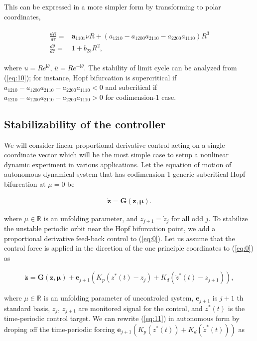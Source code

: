 \documentclass[openacc]{rsproca_new}%
\def\real{\mathbb{R}}
\def\vec#1{\ensuremath{\mathbf{#1}}}
\newcommand{\Eref}[1]{(\ref{#1})}
\begin{document}
\noindent This can be expressed in a more simpler form by transforming to polar coordinates,

\begin{align}\label{eq:10}
\begin{split}
\frac{dR}{d\tau}=&\vec{a}_{1101}\nu R+(a_{1210}-a_{1200}a_{2110}-a_{2200}a_{1110})R^3\\
\frac{d\theta}{d\tau}=&1+b_{23}R^2,
\end{split}
\end{align}

\noindent where $u=Re^{\textrm{i} \theta}$, $\bar u=Re^{-\textrm{i} \theta}$. The stability of limit cycle can be analyzed from \Eref{eq:10}; for instance, Hopf bifurcation is supercritical if \(a_{1210}-a_{1200}a_{2110}-a_{2200}a_{1110}<0\) and subcritical if \(a_{1210}-a_{1200}a_{2110}-a_{2200}a_{1110}>0\) for codimension-1 case.


\subsection{Stabilizability of the controller}

We will consider linear proportional derivative control acting on a single coordinate vector which will be the most simple case to setup a nonlinear dynamic experiment in various applications. Let the equation of motion of autonomous dynamical system that has codimension-1 generic subcritical Hopf bifurcation at $\mu=0$ be

\begin{align}\label{eq:0}
    \dot{\vec{z}} =\vec{G}(\vec{z},\vec{\mu}).
\end{align}

\noindent where $\mu\in \real$ is an unfolding parameter, and $z_{j+1}=\dot z_j$ for all odd $j$. To stabilize the unstable periodic orbit near the Hopf bifurcation point, we add a proportional derivative feed-back control to \Eref{eq:0}. Let us assume that the control force is applied in the direction of the one principle coordinates to \Eref{eq:0} as

\begin{align}\label{eq:11}
    \dot{\vec{z}} =\vec{G}(\vec{z},\vec{\mu})+\vec{e}_{j+1}(K_p(z^*(t)-z_j)+K_d(\dot z^*(t)-z_{j+1})),
\end{align}

\noindent where $\mu\in \real$ is an unfolding parameter of uncontroled system, $\vec{e}_{j+1}$ is $j+1$ th standard basis, $z_{j}$, $z_{j+1}$ are monitored signal for the control, and $z^*(t)$  is the time-periodic control target. We can rewrite \Eref{eq:11} in autonomous form by droping off the time-periodic forcing $\vec{e}_{j+1}(K_p(z^*(t))+K_d(\dot z^*(t)))$ as
\end{document}
